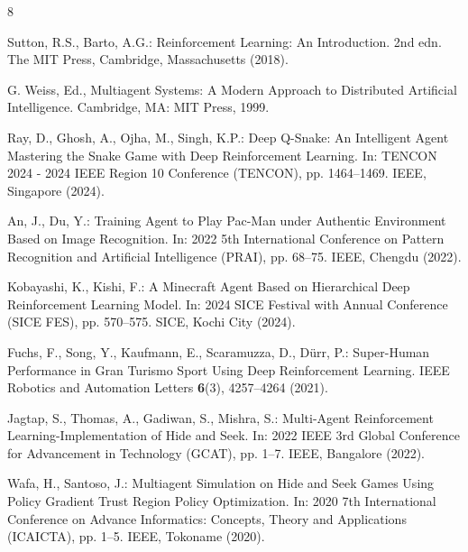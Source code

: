 \documentclass[runningheads]{llncs}
\begin{document}
%
%
%
% 
% 
%
\begin{thebibliography}{8}

Sutton, R.S., Barto, A.G.: Reinforcement Learning: An Introduction. 2nd edn. The MIT Press, Cambridge, Massachusetts (2018).

G. Weiss, Ed., Multiagent Systems: A Modern Approach to Distributed Artificial Intelligence. Cambridge, MA: MIT Press, 1999.

Ray, D., Ghosh, A., Ojha, M., Singh, K.P.: Deep Q-Snake: An Intelligent Agent Mastering the Snake Game with Deep Reinforcement Learning. In: TENCON 2024 - 2024 IEEE Region 10 Conference (TENCON), pp. 1464--1469. IEEE, Singapore (2024).

An, J., Du, Y.: Training Agent to Play Pac-Man under Authentic Environment Based on Image Recognition. In: 2022 5th International Conference on Pattern Recognition and Artificial Intelligence (PRAI), pp. 68--75. IEEE, Chengdu (2022).

Kobayashi, K., Kishi, F.: A Minecraft Agent Based on Hierarchical Deep Reinforcement Learning Model. In: 2024 SICE Festival with Annual Conference (SICE FES), pp. 570--575. SICE, Kochi City (2024).

Fuchs, F., Song, Y., Kaufmann, E., Scaramuzza, D., Dürr, P.: Super-Human Performance in Gran Turismo Sport Using Deep Reinforcement Learning. IEEE Robotics and Automation Letters \textbf{6}(3), 4257--4264 (2021).

Jagtap, S., Thomas, A., Gadiwan, S., Mishra, S.: Multi-Agent Reinforcement Learning-Implementation of Hide and Seek. In: 2022 IEEE 3rd Global Conference for Advancement in Technology (GCAT), pp. 1--7. IEEE, Bangalore (2022). 

Wafa, H., Santoso, J.: Multiagent Simulation on Hide and Seek Games Using Policy Gradient Trust Region Policy Optimization. In: 2020 7th International Conference on Advance Informatics: Concepts, Theory and Applications (ICAICTA), pp. 1--5. IEEE, Tokoname (2020).




\end{thebibliography}
\end{document}
